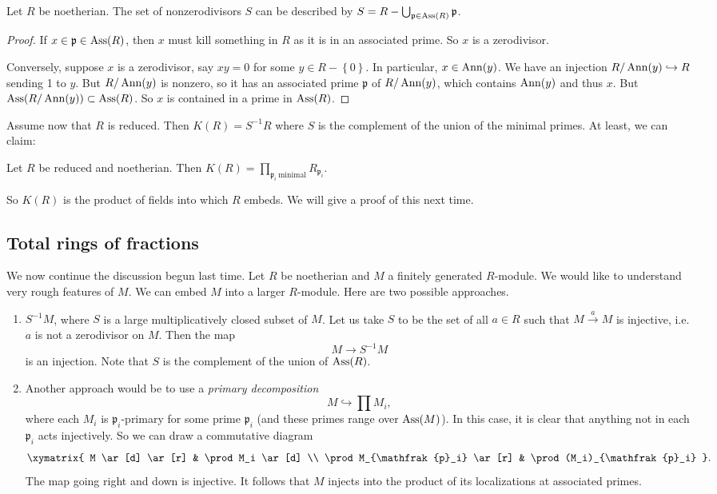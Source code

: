 \begin{proposition} Let $R$ be noetherian. The set of nonzerodivisors $S$
can be described by
$S = R- \bigcup_{\mathfrak{p} \in \operatorname{Ass}(R)} \mathfrak{p}$.
\end{proposition}
\begin{proof}
If $x \in\mathfrak{p} \in \operatorname{Ass}(R)$, then $x$ must kill something in $R$ as it
is in an associated prime.	So $x$ is a zerodivisor.

Conversely, suppose $x$ is a zerodivisor, say $xy = 0$ for some $y \in R -
\left\{0\right\}$. In
particular, $x \in \operatorname{Ann}(y)$. We have an injection $R/\operatorname{Ann}(y) \hookrightarrow R$
sending 1 to $y$. But $R/\operatorname{Ann}(y)$ is nonzero, so it has an associated prime
$\mathfrak{p}$ of $R/\operatorname{Ann}(y)$, which contains $\operatorname{Ann}(y)$ and thus $x$. But
$\operatorname{Ass}(R/\operatorname{Ann}(y)) \subset \operatorname{Ass}(R)$.
So $x$ is contained in a prime in $\operatorname{Ass}(R)$.
\end{proof}

Assume now that $R$ is reduced.  Then $K(R)  = S^{-1}R$ where $S$ is the
complement of the union of the minimal primes.
At least, we can claim:

\begin{proposition} Let $R$ be reduced and noetherian. Then
$K(R) = \prod_{\mathfrak{p}_i \ \mathrm{minimal}} R_{\mathfrak{p}_i}$.
\end{proposition}

So $K(R)$ is the product of fields into which $R$ embeds.
We will give a proof of this next time.
\subsection{Total rings of fractions}

We now continue the discussion begun last time. Let $R$ be noetherian and $M$ a
finitely generated $R$-module. We would like to understand very rough features
of $M$.
We can embed $M$ into a larger $R$-module.
Here are two possible approaches.

\begin{enumerate}
\item  $S^{-1}M$, where $S$ is a large multiplicatively closed subset of $M$.
Let us take $S $ to be the set of all $a \in R$ such that $M
\stackrel{a}{\to}M$ is injective, i.e. $a$ is not a zerodivisor on $M$. Then
the map
\[ M \to S^{-1}M  \]
is an injection. Note that $S$ is the complement of the union of $\operatorname{Ass}(R)$.
\item Another approach would be to use a \emph{primary decomposition}
\[ M \hookrightarrow \prod M_i,  \]
where each $M_i$ is $\mathfrak{p}_i$-primary for some prime $\mathfrak{p}_i$
(and these primes range over $\operatorname{Ass}(M)$). In this case, it is clear that
anything not in each $\mathfrak{p}_i$ acts injectively. So we can draw a
commutative diagram
\[
\xymatrix{
M \ar[d]  \ar[r] &  \prod M_i \ar[d]  \\
\prod M_{\mathfrak{p}_i} \ar[r] &  \prod (M_i)_{\mathfrak{p}_i}
}.
\]
The map going right and down is injective.
It follows that $M$ injects into the product of its localizations at associated
primes.
\end{enumerate}

